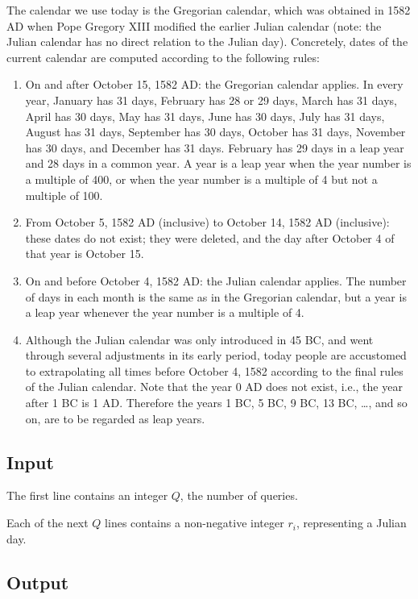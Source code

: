 \documentclass[11pt]{article}
\begin{document}
The calendar we use today is the Gregorian calendar, which was obtained in
1582 AD when Pope Gregory XIII modified the earlier Julian calendar
(note: the Julian calendar has no direct relation to the Julian day).
Concretely, dates of the current calendar are computed according to the
following rules:
\begin{enumerate}
\item On and after October 15, 1582 AD: the Gregorian calendar applies.
  In every year, January has 31 days, February has 28 or 29 days, March has
  31 days, April has 30 days, May has 31 days, June has 30 days, July has 31
  days, August has 31 days, September has 30 days, October has 31 days,
  November has 30 days, and December has 31 days.
  February has 29 days in a leap year and 28 days in a common year.
  A year is a leap year when the year number is a multiple of 400, or when
  the year number is a multiple of 4 but not a multiple of 100.
\item From October 5, 1582 AD (inclusive) to October 14, 1582 AD (inclusive):
  these dates do not exist; they were deleted, and the day after October 4
  of that year is October 15.
\item On and before October 4, 1582 AD: the Julian calendar applies.
  The number of days in each month is the same as in the Gregorian calendar,
  but a year is a leap year whenever the year number is a multiple of 4.
\item Although the Julian calendar was only introduced in 45 BC, and went
  through several adjustments in its early period, today people are
  accustomed to extrapolating all times before October 4, 1582 according to
  the final rules of the Julian calendar.
  Note that the year 0 AD does not exist, i.e., the year after 1 BC is 1 AD.
  Therefore the years 1 BC, 5 BC, 9 BC, 13 BC, \ldots, and so on, are to be
  regarded as leap years.
\end{enumerate}

\subsection*{Input}

The first line contains an integer $Q$, the number of queries.

Each of the next $Q$ lines contains a non-negative integer $r_i$,
representing a Julian day.

\subsection*{Output}
\end{document}
